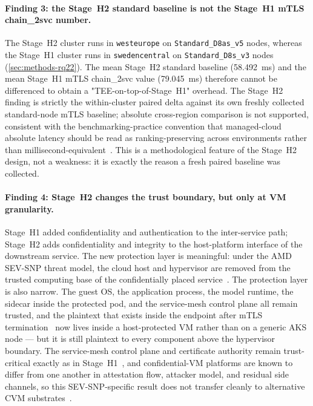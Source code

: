 \paragraph{Finding 3: the Stage~H2 standard baseline is not the Stage~H1 mTLS
chain\_2svc number.}
The Stage~H2 cluster runs in \texttt{westeurope} on
\texttt{Standard\_D8as\_v5} nodes, whereas the Stage~H1 cluster runs in
\texttt{swedencentral} on \texttt{Standard\_D8s\_v3} nodes
(\cref{sec:methods-rq22}). The mean Stage~H2 standard baseline (58.492~ms)
and the mean Stage~H1 mTLS chain\_2svc value (79.045~ms) therefore cannot be
differenced to obtain a "TEE-on-top-of-Stage~H1" overhead. The Stage~H2 finding
is strictly the within-cluster paired delta against its own freshly
collected standard-node mTLS baseline; absolute cross-region comparison
is not supported, consistent with the benchmarking-practice convention
that managed-cloud absolute latency should be read as ranking-preserving
across environments rather than millisecond-equivalent~\cite{benchmarking_sc15,noise_in_clouds}.
This is a methodological feature of the Stage~H2 design, not a weakness: it
is exactly the reason a fresh paired baseline was collected.

\paragraph{Finding 4: Stage~H2 changes the trust boundary, but only at VM
granularity.}
Stage~H1 added confidentiality and authentication to the inter-service path;
Stage~H2 adds confidentiality and integrity to the host-platform interface
of the downstream service. The new protection layer is meaningful: under
the AMD SEV-SNP threat model, the cloud host and hypervisor are removed
from the trusted computing base of the confidentially placed
service~\cite{amd_sevsnp_whitepaper}. The protection layer is also
narrow. The guest OS, the application process, the model runtime, the
sidecar inside the protected pod, and the service-mesh control plane all
remain trusted, and the plaintext that exists inside the endpoint after
mTLS termination~\cite{meshinsight_socc23} now lives inside a
host-protected VM rather than on a generic AKS node --- but it is still
plaintext to every component above the hypervisor boundary. The
service-mesh control plane and certificate authority remain trust-critical
exactly as in Stage~H1~\cite{poudel2025mazu}, and confidential-VM platforms
are known to differ from one another in attestation flow, attacker
model, and residual side channels, so this SEV-SNP-specific result does
not transfer cleanly to alternative CVM
substrates~\cite{guanciale2022_confidential_quartet}.

